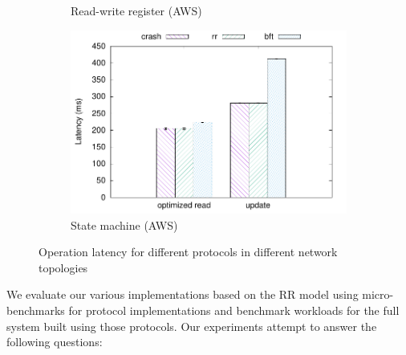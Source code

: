 \begin{figure}[th!]
\begin{subfigure}[t]{0.24 * 10cm}
        \caption{Read-write register (AWS)}\label{fig:aws_reg_lat}
    \end{subfigure}
    \begin{subfigure}[t]{0.24 * 10cm}
        \centering
        \includegraphics[width=\linewidth]{teem_results/protocol/aws/aws_smr}
        \caption{State machine (AWS)}\label{fig:aws_smr_lat}
    \end{subfigure}
    \caption{Operation latency for different protocols in
    different network topologies}
\end{figure}\label{fig:protocol_lat}
We evaluate our various implementations based on the \ac{RR} model using micro-benchmarks for protocol implementations and benchmark workloads for the full system built using those protocols. Our experiments attempt to answer the
following questions:

